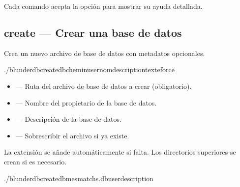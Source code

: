 \documentclass[letterpaper,10pt,spanish]{sphinxmanual}
\begin{document}
\sphinxAtStartPar
Cada comando acepta la opción  para mostrar su ayuda detallada.


\subsection{create — Crear una base de datos}
\label{\detokenize{cli:create-creer-une-base-de-donnees}}
\sphinxAtStartPar
Crea un nuevo archivo de base de datos con metadatos opcionales.

\begin{sphinxVerbatim}[commandchars=\\\{\}]
./blunderdbcreate\PYGZhy{}\PYGZhy{}db\PYGZlt{}chemin\PYGZgt{}\PYG{o}{[}\PYGZhy{}\PYGZhy{}user\PYGZlt{}nom\PYGZgt{}\PYG{o}{]}\PYG{o}{[}\PYGZhy{}\PYGZhy{}description\PYGZlt{}texte\PYGZgt{}\PYG{o}{]}\PYG{o}{[}\PYGZhy{}\PYGZhy{}force\PYG{o}{]}
\end{sphinxVerbatim}

\sphinxAtStartPar
{}
\begin{itemize}
\item {} 
\sphinxAtStartPar
{} — Ruta del archivo de base de datos a crear (obligatorio).

\item {} 
\sphinxAtStartPar
{} — Nombre del propietario de la base de datos.

\item {} 
\sphinxAtStartPar
{} — Descripción de la base de datos.

\item {} 
\sphinxAtStartPar
{} — Sobrescribir el archivo si ya existe.

\end{itemize}

\sphinxAtStartPar
La extensión  se añade automáticamente si falta. Los directorios superiores se crean si es necesario.

\sphinxAtStartPar
{}

\begin{sphinxVerbatim}[commandchars=\\\{\}]
./blunderdbcreate\PYGZhy{}\PYGZhy{}dbmes\PYGZus{}matchs.db\PYGZhy{}\PYGZhy{}user\PYGZhy{}\PYGZhy{}description
\end{sphinxVerbatim}
\end{document}
